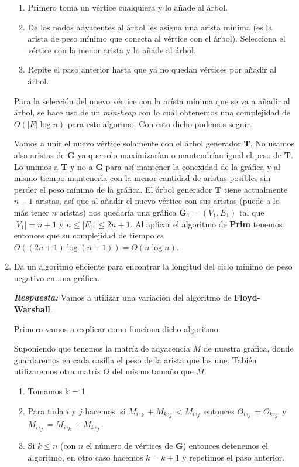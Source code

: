 \documentclass[11pt,letterpaper]{article}
\newcommand\respuesta{\textbf{\textit{Respuesta: }}}
\begin{document}
\begin{enumerate}[leftmargin=*]
    \begin{enumerate}
      \item Primero toma un vértice cualquiera y lo añade al árbol. 
      \item De los nodos adyacentes al árbol les asigna una arista mínima (es la arista de peso mínimo que conecta al vértice con el árbol).
      Selecciona el vértice con la menor arista y lo añade al árbol.
      \item Repite el paso anterior hasta que ya no quedan vértices por añadir al árbol. 
    \end{enumerate}
    
    Para la selección del nuevo vértice con la arísta mínima que se va a añadir al árbol, se hace uso de un \textit{min-heap} con lo cuál obtenemos una complejidad de $O(|E| \log n)$ para este algorimo.
    Con esto dicho podemos seguir. 
    
    Vamos a unir el nuevo vértice solamente con el árbol generador \textbf{T}.
    No usamos alsa aristas de \textbf{G} ya que solo maximizarían o mantendrían igual el peso de \textbf{T}.
    Lo unimos a \textbf{T} y no a \textbf{G} para así mantener la conexidad de la gráfica y al mismo tiempo mantenerla con la menor cantidad de aristas posibles sin perder el peso mínimo de la gráfica.
    El árbol generador $\mathbf{T}$ tiene actualmente $n - 1$ aristas, así que al añadir el nuevo vértice con sus aristas (puede a lo más tener $n$ aristas) nos quedaría una gráfica $\mathbf{G_1} = (V_1, E_1)$ tal que $|V_1| = n + 1$ y $n \leq |E_1| \leq 2n + 1$.
    Al aplicar el algoritmo de \textbf{Prim} tenemos entonces que su complejidad de tiempo es $O((2n + 1) \log (n + 1)) = O (n \log n)$. 

    \item Da un algoritmo eficiente para encontrar la longitud del ciclo mínimo de peso negativo en una gráfica.
    
    \respuesta Vamos a utilizar una variación del algoritmo de \textbf{Floyd-Warshall}.

    Primero vamos a explicar como funciona dicho algoritmo:
    
    Suponiendo que tenemos la matríz de adyacencia $M$ de nuestra gráfica, donde guardaremos en cada casilla el peso de la arista que las une.
    Tabién utilizaremos otra matríz $O$ del mismo tamaño que $M$.
    \begin{enumerate}
      \item Tomamos k = 1 
      \item Para toda $i$ y $j$ hacemos: si $M_i,_k + M_k,_j < M_i,_j$ entonces $O_i,_j = O_k,_j$ y $M_i,_j = M_i,_k + M_k,_j$.
      \item Si $k \leq n$ (con $n$ el número de vértices de \textbf{G}) entonces detenemos el algoritmo, en otro caso hacemos $k = k + 1$ y repetimos el paso anterior.
    \end{enumerate}


\end{enumerate}
\end{document}
